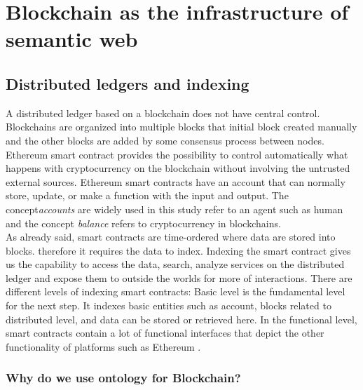 \chapter{Blockchain as the infrastructure of semantic web}

\section{Distributed ledgers and indexing}
A distributed ledger based on a blockchain does not have central control. Blockchains are organized into multiple blocks that initial block created manually and the other blocks are added by some consensus process between nodes.
Ethereum smart contract provides the possibility to control automatically what happens with cryptocurrency on the blockchain without involving the untrusted external sources. Ethereum smart contracts have an account that can normally store, update, or make a function with the input and output.
The concept\textit{accounts} are widely used in this study refer to an agent such as human and the concept \textit{balance} refers to cryptocurrency in blockchains. \\ 
As already said, smart contracts are time-ordered where data are stored into blocks. therefore it requires the data to index. Indexing the smart contract gives us the capability to access the data, search, analyze services on the distributed ledger and expose them to outside the worlds for more of interactions.
There are different levels of indexing smart contracts: Basic level is the fundamental level for the next step. It indexes basic entities such as account, blocks related to distributed level, and data can be stored or retrieved here. In the functional level, smart contracts contain a lot of functional interfaces that depict the other functionality of platforms such as Ethereum \cite{Third}. 

\subsection{Why do we use ontology for Blockchain?}

